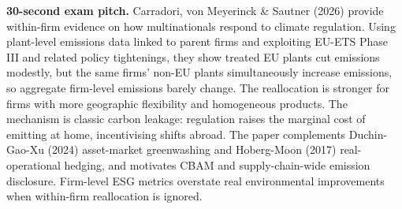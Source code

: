 \documentclass[11pt]{article}
\begin{document}
\begin{keybox}
\textbf{30-second exam pitch.} Carradori, von Meyerinck \& Sautner (2026) provide within-firm evidence on how multinationals respond to climate regulation. Using plant-level emissions data linked to parent firms and exploiting EU-ETS Phase III and related policy tightenings, they show treated EU plants cut emissions modestly, but the same firms' non-EU plants simultaneously increase emissions, so aggregate firm-level emissions barely change. The reallocation is stronger for firms with more geographic flexibility and homogeneous products. The mechanism is classic carbon leakage: regulation raises the marginal cost of emitting at home, incentivising shifts abroad. The paper complements Duchin-Gao-Xu (2024) asset-market greenwashing and Hoberg-Moon (2017) real-operational hedging, and motivates CBAM and supply-chain-wide emission disclosure. Firm-level ESG metrics overstate real environmental improvements when within-firm reallocation is ignored.
\end{keybox}
\end{document}
